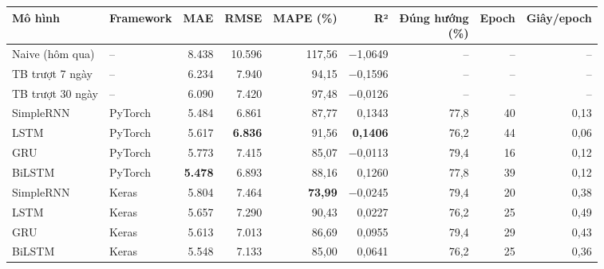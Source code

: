 \begin{tabular}{llrrrrrrr}
\toprule
Mô hình & Framework & MAE & RMSE & MAPE (\%) & R² & \makecell[r]{Đúng hướng\\(\%)} & Epoch & Giây/epoch \\
\midrule
Naive (hôm qua) & -- & 8{.}438 & 10{.}596 & 117{,}56 & \ensuremath{-}1{,}0649 & -- & -- & -- \\
TB trượt 7 ngày & -- & 6{.}234 & 7{.}940 & 94{,}15 & \ensuremath{-}0{,}1596 & -- & -- & -- \\
TB trượt 30 ngày & -- & 6{.}090 & 7{.}420 & 97{,}48 & \ensuremath{-}0{,}0126 & -- & -- & -- \\
\midrule
SimpleRNN & PyTorch & 5{.}484 & 6{.}861 & 87{,}77 & 0{,}1343 & 77{,}8 & 40 & 0{,}13 \\
LSTM & PyTorch & 5{.}617 & \textbf{6{.}836} & 91{,}56 & \textbf{0{,}1406} & 76{,}2 & 44 & 0{,}06 \\
GRU & PyTorch & 5{.}773 & 7{.}415 & 85{,}07 & \ensuremath{-}0{,}0113 & 79{,}4 & 16 & 0{,}12 \\
BiLSTM & PyTorch & \textbf{5{.}478} & 6{.}893 & 88{,}16 & 0{,}1260 & 77{,}8 & 39 & 0{,}12 \\
\midrule
SimpleRNN & Keras & 5{.}804 & 7{.}464 & \textbf{73{,}99} & \ensuremath{-}0{,}0245 & 79{,}4 & 20 & 0{,}38 \\
LSTM & Keras & 5{.}657 & 7{.}290 & 90{,}43 & 0{,}0227 & 76{,}2 & 25 & 0{,}49 \\
GRU & Keras & 5{.}613 & 7{.}013 & 86{,}69 & 0{,}0955 & 79{,}4 & 29 & 0{,}43 \\
BiLSTM & Keras & 5{.}548 & 7{.}133 & 85{,}00 & 0{,}0641 & 76{,}2 & 25 & 0{,}36 \\
\bottomrule
\end{tabular}
